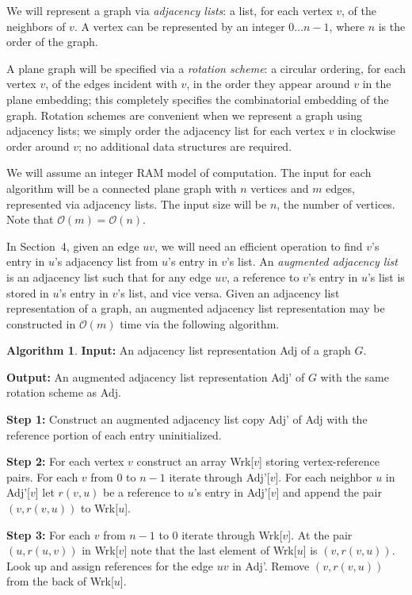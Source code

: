 \documentclass[12pt,letterpaper]{article}
\theoremstyle{plain}
\theoremstyle{definition}
\theoremstyle{break}
\newtheorem{algorithm}[lemma]{Algorithm}     %
\newcommand{\defterm}[1]{\emph{#1}} %
\begin{document}
We will represent a graph via \textit{adjacency lists}:
a list, for each vertex $v$, of the neighbors of $v$.
A vertex can be represented by an integer $0\dots n-1$,
where $n$ is the order of the graph.

A plane graph will be specified via
a \defterm{rotation scheme}:
a circular ordering,
for each vertex $v$, of the edges incident with $v$,
in the order they appear around $v$ in the plane embedding;
this completely specifies
the combinatorial embedding of the graph.
Rotation schemes are convenient when we represent a graph
using adjacency lists;
we simply order the adjacency
list for each vertex $v$ in clockwise order around $v$;
no additional data structures are required.

We will assume an integer RAM model of computation. The input for each algorithm
will be a connected plane graph with $n$ vertices and $m$ edges, represented
via adjacency lists. The input size will be $n$, the number of vertices. Note
that $\mathcal{O}(m)=\mathcal{O}(n)$.

In Section~4, given an edge $uv$, we will need an efficient operation to
find $v$'s entry in $u$'s adjacency list from $u$'s entry in $v$'s list.
An \defterm{augmented adjacency list} is an adjacency list such that for
any edge $uv$, a reference to $v$'s entry in
$u$'s list is stored in $u$'s entry in $v$'s list, and vice versa. Given an
adjacency list representation of a graph, an augmented
adjacency list representation may be constructed in $\mathcal{O}(m)$ time via
the following algorithm.

\begin{algorithm} \label{A:augment}
\textbf{Input:} An adjacency list representation Adj of a graph $G$.

\noindent\textbf{Output:} An augmented adjacency list representation Adj' of $G$ with
the same rotation scheme as Adj.

\noindent\textbf{Step 1:} Construct an augmented adjacency list copy Adj' of Adj with
the reference portion of each entry uninitialized.

\noindent\textbf{Step 2:} For each vertex $v$ construct an array Wrk[$v$] storing
vertex-reference pairs. For each $v$ from $0$ to $n-1$ iterate through
Adj'[$v$]. For each neighbor $u$ in Adj'[$v$] let
$r(v,u)$ be a reference to $u$'s entry in Adj'[$v$] and append the pair
$(v,r(v,u))$ to Wrk[$u$].

\noindent\textbf{Step 3:} For each $v$ from $n-1$ to $0$ iterate through Wrk[$v$]. At
the pair $(u,r(u,v))$ in Wrk[$v$] note that the last element of Wrk[$u$] is
$(v,r(v,u))$. Look up and assign references for the edge $uv$ in Adj'. Remove
$(v,r(v,u))$ from the back of Wrk[$u$].
\end{algorithm}
\end{document}
